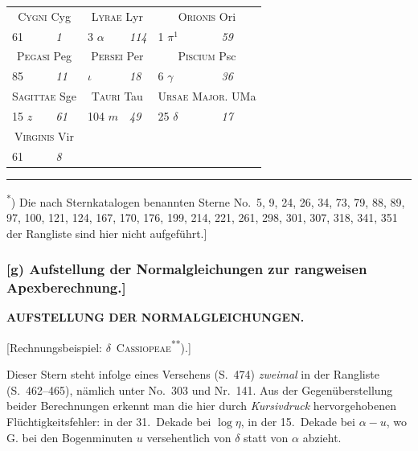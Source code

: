 \documentclass[12pt,a4paper]{article}
\theoremstyle{plain}
\theoremstyle{definition}
\theoremstyle{remark}
\begin{document}
\begin{small}
\begin{center}
\begin{tabular}{ll|ll|ll}
\multicolumn{2}{c}{\textsc{Cygni} Cyg} &
\multicolumn{2}{c}{\textsc{Lyrae} Lyr} &
\multicolumn{2}{c}{\textsc{Orionis} Ori} \\
61 & \textit{1} & 3 $\alpha$ & \textit{114} & 1 $\pi^{1}$ & \textit{59} \\
\multicolumn{2}{c}{\textsc{Pegasi} Peg} &
\multicolumn{2}{c}{\textsc{Persei} Per} &
\multicolumn{2}{c}{\textsc{Piscium} Psc} \\
85 & \textit{11} & $\iota$ & \textit{18} & 6 $\gamma$ & \textit{36} \\
\multicolumn{2}{c}{\textsc{Sagittae} Sge} &
\multicolumn{2}{c}{\textsc{Tauri} Tau} &
\multicolumn{2}{c}{\textsc{Ursae Major.} UMa} \\
15 $z$ & \textit{61} & 104 $m$ & \textit{49} & 25 $\delta$ & \textit{17} \\
\multicolumn{2}{c}{\textsc{Virginis} Vir} & & & & \\
61 & \textit{8} & & & & \\
\end{tabular}
\end{center}
\end{small}

\medskip
\noindent\rule{\textwidth}{0.4pt}
\begin{footnotesize}
\textsuperscript{*}) Die nach Sternkatalogen benannten Sterne No.~5, 9, 24, 26, 34, 73, 79,
88, 89, 97, 100, 121, 124, 167, 170, 176, 199, 214, 221, 261, 298, 301, 307, 318,
341, 351 der Rangliste sind hier nicht aufgef\"uhrt.]
\end{footnotesize}

\newpage
\subsubsection*{[g) Aufstellung der Normalgleichungen zur rangweisen Apexberechnung.]}

\begin{center}
\textbf{AUFSTELLUNG DER NORMALGLEICHUNGEN.}
\end{center}

\begin{small}

[Rechnungsbeispiel: $\delta$~\textsc{Cassiopeae}\textsuperscript{**}).]

Dieser Stern steht infolge eines Versehens (S.~474) \textit{zweimal} in der Rangliste
(S.~462--465), n\"amlich unter No.~303 und Nr.~141. Aus der Gegen\"uberstellung
beider Berechnungen erkennt man die hier durch \textit{Kursivdruck} hervorgehobenen
Fl\"uchtigkeitsfehler: in der 31.~Dekade bei $\log\eta$, in der 15.~Dekade bei $\alpha - u$,
wo \textsc{G.} bei den Bogenminuten $u$ versehentlich von $\delta$ statt von $\alpha$ abzieht.
\end{small}
\end{document}
